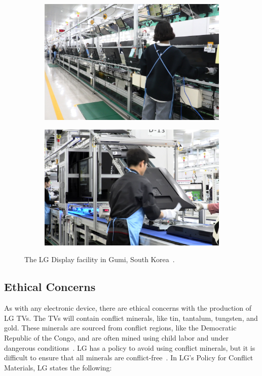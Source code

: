 \documentclass[12pt, letterpaper]{article}
\makeatletter
\newcommand\todo[1]{{\color{red}{\footnotesize[TODO:\@ #1]}}}
\makeatother
\begin{document}
\begin{figure}[H]
  \medskip
  \begin{subfigure}{.5\textwidth}
    \centering
    \includegraphics[width=.9\linewidth]{gumi-facility-1}
  \end{subfigure}%
  \begin{subfigure}{.5\textwidth}
    \centering
    \includegraphics[width=.9\linewidth]{gumi-facility-2}
  \end{subfigure}
  \caption{The LG Display facility in Gumi, South Korea~\autocite{kaplan-2016}.}
  \medskip\label{fig:gumi-facility}
\end{figure}

\todo{Is this enough for criterion B?}

\subsection{Ethical Concerns}

As with any electronic device, there are ethical concerns with the
production of LG TVs. The TVs will contain conflict minerals, like
tin, tantalum, tungsten, and gold. These minerals are sourced from
conflict regions, like the Democratic
Republic of the Congo, and are often mined using child labor and
under dangerous conditions~\autocite{hower-2013}. LG has a policy to
avoid using conflict
minerals, but it is difficult to ensure that all minerals are
conflict-free~\autocite{lg-electronics-no-date}. In LG's Policy for
Conflict Materials, LG states the following:
\end{document}

